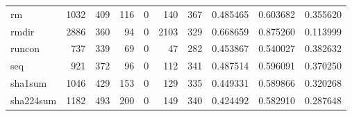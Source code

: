 \begin{tabular}{lrrrrrrrrr}
rm        &                                               1032 &                                                409 &                                                116 &                                                  0 &                                                140 &                                                367 &                                           0.485465 &                               0.603682 &                             0.355620 \\
rmdir     &                                               2886 &                                                360 &                                                 94 &                                                  0 &                                               2103 &                                                329 &                                           0.668659 &                               0.875260 &                             0.113999 \\
runcon    &                                                737 &                                                339 &                                                 69 &                                                  0 &                                                 47 &                                                282 &                                           0.453867 &                               0.540027 &                             0.382632 \\
seq       &                                                921 &                                                372 &                                                 96 &                                                  0 &                                                112 &                                                341 &                                           0.487514 &                               0.596091 &                             0.370250 \\
sha1sum   &                                               1046 &                                                429 &                                                153 &                                                  0 &                                                129 &                                                335 &                                           0.449331 &                               0.589866 &                             0.320268 \\
sha224sum &                                               1182 &                                                493 &                                                200 &                                                  0 &                                                149 &                                                340 &                                           0.424492 &                               0.582910 &                             0.287648 \\

\end{tabular}
